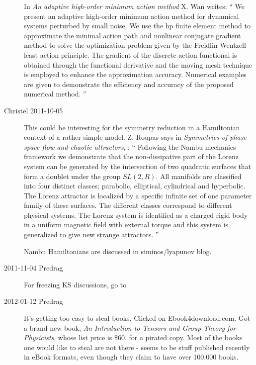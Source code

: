 \begin{description}
In {\em An adaptive high-order minimum action method}
X. Wan writes: ``
We present an adaptive high-order minimum
action method for dynamical systems perturbed by small noise. We use the
hp finite element method to approximate the minimal action path and
nonlinear conjugate gradient method to solve the optimization problem
given by the Freidlin-Wentzell least action principle. The gradient of
the discrete action functional is obtained through the functional
derivative and the moving mesh technique is employed to enhance the
approximation accuracy. Numerical examples are given to demonstrate the
efficiency and accuracy of the proposed numerical method.
''

\item[Christel 2011-10-05 ] This could be interesting for the symmetry
reduction in a Hamiltonian context of a rather simple model.
Z. Roupas says in
\emph{Symmetries of phase space flow and chaotic attractors},
 : ``
Following the Nambu mechanics framework we demonstrate that the
non-dissipative part of the Lorenz system can be generated by the
intersection of two quadratic surfaces that form a doublet under the
group $SL(2,R)$. All manifolds are classified into four distinct classes;
parabolic, elliptical, cylindrical and hyperbolic. The Lorenz attractor
is localized by a specific infinite set of one parameter family of these
surfaces. The different classes correspond to different physical systems.
The Lorenz system is identified as a charged rigid body in a uniform
magnetic field with external torque and this system is generalized to
give new strange attractors.
''

Nambu Hamiltonians are discussed in siminos/lyapunov blog.

\item[2011-11-04 Predrag] For freezing KS discussions, go to

\item[2012-01-12 Predrag] It's getting too easy to steal books. Clicked on
{Ebook4download.com}. Got a brand new book, {\em An
Introduction to Tensors and Group Theory for Physicists}, whose list
price is \$60. 
for a pirated copy. Most of the books one would like to steal are not
there - seems to be stuff published recently in eBook formats, even though
they claim to have over 100,000 books.


\end{description}
